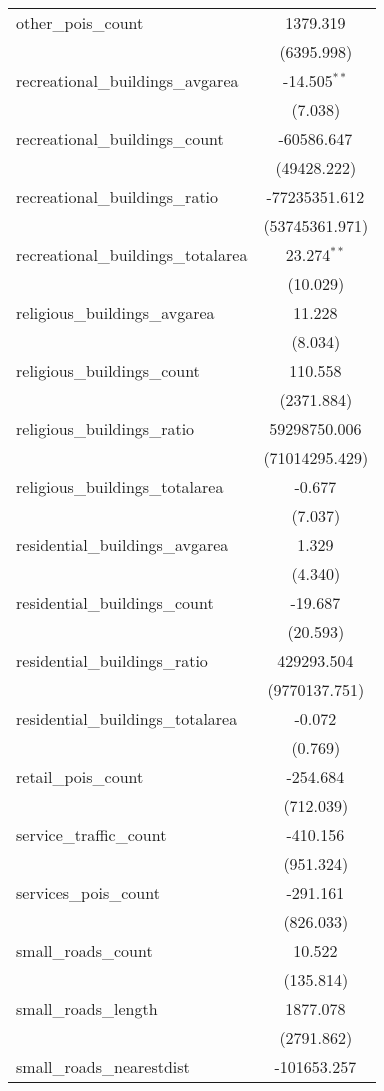 \begin{table}[!htbp]
\begin{tabular}{@{\extracolsep{5pt}}lc}
 other_pois_count & 1379.319$^{}$ \\
  & (6395.998) \\
 recreational_buildings_avgarea & -14.505$^{**}$ \\
  & (7.038) \\
 recreational_buildings_count & -60586.647$^{}$ \\
  & (49428.222) \\
 recreational_buildings_ratio & -77235351.612$^{}$ \\
  & (53745361.971) \\
 recreational_buildings_totalarea & 23.274$^{**}$ \\
  & (10.029) \\
 religious_buildings_avgarea & 11.228$^{}$ \\
  & (8.034) \\
 religious_buildings_count & 110.558$^{}$ \\
  & (2371.884) \\
 religious_buildings_ratio & 59298750.006$^{}$ \\
  & (71014295.429) \\
 religious_buildings_totalarea & -0.677$^{}$ \\
  & (7.037) \\
 residential_buildings_avgarea & 1.329$^{}$ \\
  & (4.340) \\
 residential_buildings_count & -19.687$^{}$ \\
  & (20.593) \\
 residential_buildings_ratio & 429293.504$^{}$ \\
  & (9770137.751) \\
 residential_buildings_totalarea & -0.072$^{}$ \\
  & (0.769) \\
 retail_pois_count & -254.684$^{}$ \\
  & (712.039) \\
 service_traffic_count & -410.156$^{}$ \\
  & (951.324) \\
 services_pois_count & -291.161$^{}$ \\
  & (826.033) \\
 small_roads_count & 10.522$^{}$ \\
  & (135.814) \\
 small_roads_length & 1877.078$^{}$ \\
  & (2791.862) \\
 small_roads_nearestdist & -101653.257$^{}$ \\

\end{tabular}
\end{table}
